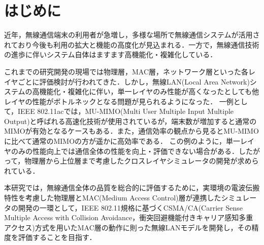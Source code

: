 \documentclass[a4paper,10pt]{ltjsarticle}
\begin{document}

\tableofcontents
\thispagestyle{empty}



\clearpage
\setcounter{page}{1}

\section{はじめに}

近年，無線通信端末の利用者が急増し，多様な場所で無線通信システムが活用されており今後も利用の拡大と機能の高度化が見込まれる．一方で，無線通信技術の進歩に伴いシステム自体はますます高機能化・複雑化している．


これまでの研究開発の現場では物理層，MAC層，ネットワーク層といった各レイヤごとに評価検討が行われてきた．しかし，無線LAN(Local Area Network)システムの高機能化・複雑化に伴い，単一レイヤのみ性能が高くなったとしても他レイヤの性能がボトルネックとなる問題が見られるようになった．
一例として，IEEE 802.11ac\cite{11std}では，MU-MIMO(Multi User Multiple Input Multiple Output)と呼ばれる高速化技術が使用されているが，端末数が増加すると通常のMIMOが有効となるケースもある．また，通信効率の観点から見るとMU-MIMOに比べて通常のMIMOの方が遥かに高効率である\cite{book1}．
この例のように，単一レイヤのみの性能向上では通信全体の性能を向上・評価できない場合がある．したがって，物理層から上位層まで考慮したクロスレイヤシミュレータの開発が求められている．


本研究では，無線通信全体の品質を総合的に評価するために，実環境の電波伝搬特性を考慮した物理層とMAC(Medium Access Control)層が連携したシミュレータの開発の一環として，IEEE 802.11規格\cite{11std}に基づくCSMA/CA(Carrier Sense Multiple Access with Collision Avoidance，衝突回避機能付きキャリア感知多重アクセス)方式を用いたMAC層の動作に則った無線LANモデルを開発し，その精度を評価することを目指す．


\end{document}
